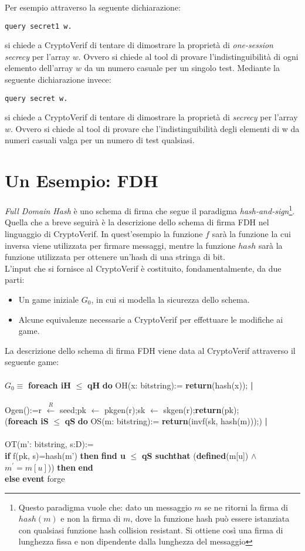 \documentclass[a4paper,openright,twoside,12pt]{report}
\newcommand{\foreach}[2]{\textbf{foreach #1} $\leq$ \textbf{#2} \textbf{do}}
\newcommand{\return}[1]{\textbf{return}(#1);}
\newcommand{\pipe}{ \textbf{|} \\ \\}
\newcommand{\setR}[2]{#1 $\xleftarrow{R}$ #2;}
\newcommand{\set}[2]{#1 $\leftarrow$ #2;}
\newcommand{\ifthen}[2]{\textbf{if} #1 \textbf{then} #2}
\newcommand{\find}[6]{\textbf{find #1} $\leq$ \textbf{#2 suchthat} (\textbf{defined}(#3) $\wedge$ #4)) \textbf{then} #5 \\ \textbf{else} #6}
\newcommand{\event}{\textbf{event}}
\newcommand{\myend}{\textbf{end}}
\begin{document}
Per esempio attraverso la seguente dichiarazione:
\begin{verbatim}
query secret1 w. 
\end{verbatim}
si chiede a CryptoVerif di tentare di dimostrare la propriet\`a di \emph{one-session secrecy} per l'array $w$. 
Ovvero si chiede al tool di provare l'indistinguibilit\`a di ogni elemento dell'array $w$ da un numero casuale per un singolo test. 
Mediante la seguente dichiarazione invece:
\begin{verbatim}
query secret w. 
\end{verbatim}
si chiede a CryptoVerif di tentare di dimostrare la propriet\`a di \emph{secrecy} per l'array $w$. Ovvero si chiede al tool di provare che l'indistinguibilit\`a degli elementi di w da numeri casuali 
valga per un numero di test qualsiasi.
\section{Un Esempio: FDH}
\emph{Full Domain Hash} \`e uno schema di firma che segue il paradigma \emph{hash-and-sign}\footnote{Questo paradigma vuole che: dato un messaggio $m$ se ne ritorni 
la firma di $hash(m)$ e non la firma di $m$, dove la funzione hash pu\`o essere istanziata con qualsiasi funzione hash collision resistant. 
Si ottiene cos\`i una firma di lunghezza fissa e non dipendente dalla lunghezza del messaggio}. 
Quella che a breve seguir\`a \`e la descrizione dello schema di firma FDH nel linguaggio di CryptoVerif. In quest'esempio la funzione $f$ sar\`a la funzione la cui inversa
viene utilizzata per firmare messaggi, mentre la funzione $hash$ sar\`a la funzione utilizzata per ottenere un'hash di una stringa di bit.\\
L'input che si fornisce al CryptoVerif \`e costituito, fondamentalmente, da due parti: 
\begin{itemize}
 \item Un game iniziale $G_0$, in cui si modella la sicurezza dello schema.
 \item Alcune equivalenze necessarie a CryptoVerif per effettuare le modifiche ai game. 
\end{itemize}
La descrizione dello schema di firma FDH viene data al CryptoVerif attraverso il seguente game:\\ \\

$G_0 \equiv$ \foreach{iH}{qH} OH(x: bitstring):= \return{hash(x)}\pipe Ogen():=\setR{r}{seed}\set{pk}{pkgen(r)}\set{sk}{skgen(r)}\return{pk}\\
	(\foreach{iS}{qS} OS(m: bitstring):= \return{invf(sk, hash(m))})\pipe
	OT(m': bitstring, s:D):=\\ \ifthen{f(pk, s)=hash(m')}{\find{u}{qS}{m[u]} {$m^{'}=m[u]$} {\myend} {\event} forge}
	\\
\end{document}
